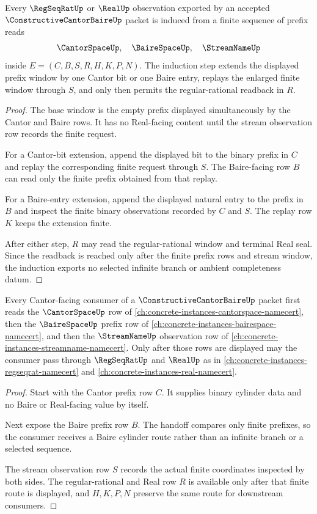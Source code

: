 \begin{theorem}
\label{thm:constructive-cantor-baire-regular-cauchy-induction}
Every $\RegSeqRatUp$ or $\RealUp$ observation exported by an accepted $\ConstructiveCantorBaireUp$ packet is induced from a finite sequence of prefix reads
$$
\CantorSpaceUp,\quad \BaireSpaceUp,\quad \StreamNameUp
$$
inside $E=(C,B,S,R,H,K,P,N)$. The induction step extends the displayed prefix window by one Cantor bit or one Baire entry, replays the enlarged finite window through $S$, and only then permits the regular-rational readback in $R$.
\end{theorem}
\begin{proof}
The base window is the empty prefix displayed simultaneously by the Cantor and Baire rows. It has no Real-facing content until the stream observation row records the finite request.

For a Cantor-bit extension, append the displayed bit to the binary prefix in $C$ and replay the corresponding finite request through $S$. The Baire-facing row $B$ can read only the finite prefix obtained from that replay.

For a Baire-entry extension, append the displayed natural entry to the prefix in $B$ and inspect the finite binary observations recorded by $C$ and $S$. The replay row $K$ keeps the extension finite.

After either step, $R$ may read the regular-rational window and terminal Real seal. Since the readback is reached only after the finite prefix rows and stream window, the induction exports no selected infinite branch or ambient completeness datum.
\end{proof}

\begin{theorem}
\label{thm:constructive-cantor-baire-cantor-space-handoff}
Every Cantor-facing consumer of a $\ConstructiveCantorBaireUp$ packet first reads the $\CantorSpaceUp$ row of \autoref{ch:concrete-instances-cantorspace-namecert}, then the $\BaireSpaceUp$ prefix row of \autoref{ch:concrete-instances-bairespace-namecert}, and then the $\StreamNameUp$ observation row of \autoref{ch:concrete-instances-streamname-namecert}. Only after those rows are displayed may the consumer pass through $\RegSeqRatUp$ and $\RealUp$ as in \autoref{ch:concrete-instances-regseqrat-namecert} and \autoref{ch:concrete-instances-real-namecert}.
\end{theorem}
\begin{proof}
Start with the Cantor prefix row $C$. It supplies binary cylinder data and no Baire or Real-facing value by itself.

Next expose the Baire prefix row $B$. The handoff compares only finite prefixes, so the consumer receives a Baire cylinder route rather than an infinite branch or a selected sequence.

The stream observation row $S$ records the actual finite coordinates inspected by both sides. The regular-rational and Real row $R$ is available only after that finite route is displayed, and $H,K,P,N$ preserve the same route for downstream consumers.
\end{proof}

